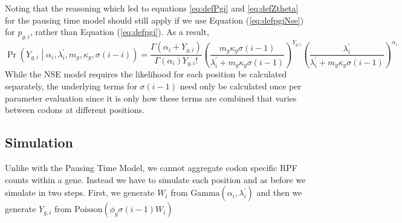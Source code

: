 \documentclass{article}
\newcommand{\alphai}{\ensuremath{{\alpha_i}}\xspace}
\newcommand{\lambdaiprime}{\ensuremath{{\lambda_i^\prime}}\xspace}
\newcommand{\pgi}{\ensuremath{{p_{g,i}}}\xspace}
\newcommand{\mg}{\ensuremath{{m_g}}\xspace}
\newcommand{\kappag}{\ensuremath{{\kappa_{g}}}\xspace}
\newcommand{\Ygi}{\ensuremath{{Y_{g,i}}}\xspace}
\begin{document}
Noting that the reasoning which led to equations \ref{eq:defPgi} and \ref{eq:defZtheta} for the pausing time model should still apply if we use Equation (\ref{eq:defpgiNse}) for \pgi, rather than Equation (\ref{eq:defpgi}). 
As a result,
\begin{equation}
  \label{eq:distYgSiteNse}
  \Pr\left(\Ygi \middle| \alphai, \lambdaiprime, \mg, \kappag, \sigma(i-i)\right) = \frac{\Gamma\left(\alphai + \Ygi\right)}{\Gamma\left(\alphai\right) \Ygi!} 
  \left(\frac{\mg \kappag \sigma(i-1)}{\lambdaiprime + \mg \kappag \sigma(i-1)}\right)^\Ygi \left(\frac{\lambdaiprime}{\lambdaiprime + \mg \kappag \sigma(i-1)}\right)^\alphai
\end{equation}
While the NSE model requires the likelihood for each position be calculated separately, the underlying terms for $\sigma(i-1)$ need only be calculated once per parameter evaluation since it is only how these terms are combined that varies between codons at different positions.

\subsection*{Simulation}
Unlike with the Pausing Time Model, we cannot aggregate codon specific RPF counts within a gene.
Instead we have to simulate each position and as before we simulate in two steps.
First, we generate $W_i$  from $\text{Gamma}(\alphai, \lambdaiprime)$ and then we generate $\Ygi$ from $\text{Poisson}\left(\phi_g \sigma(i-1) W_i\right)$
\end{document}
